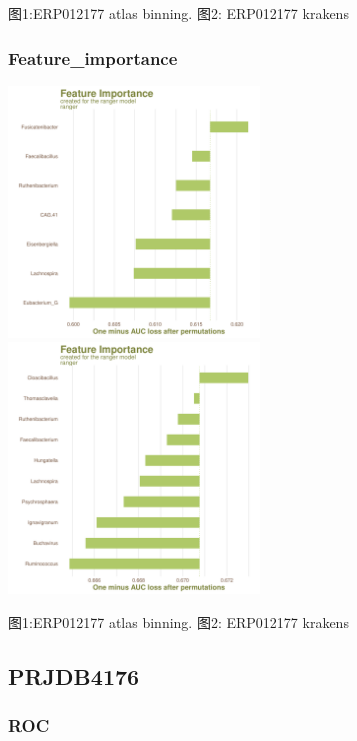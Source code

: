\documentclass[
]{article}
\begin{document}
图1:ERP012177 atlas binning. 图2: ERP012177 krakens

\hypertarget{feature_importance}{%
\subsubsection{Feature\_importance}\label{feature_importance}}

\includegraphics[width=0.5\textwidth,height=0.5\textheight]{../../Analysis_shotgun_ERP012177/03_ML/shotgun/atlas_binning/ERP012177_binning_best.model_draw_feature_importance_plot.pdf}
\includegraphics[width=0.5\textwidth,height=0.5\textheight]{../../Analysis_shotgun_ERP012177/03_ML/shotgun/krakens/ERP012177_best.model_draw_feature_importance_plot.pdf}

图1:ERP012177 atlas binning. 图2: ERP012177 krakens

\hypertarget{prjdb4176}{%
\subsection{PRJDB4176}\label{prjdb4176}}

\hypertarget{roc-1}{%
\subsubsection{ROC}\label{roc-1}}
\end{document}

